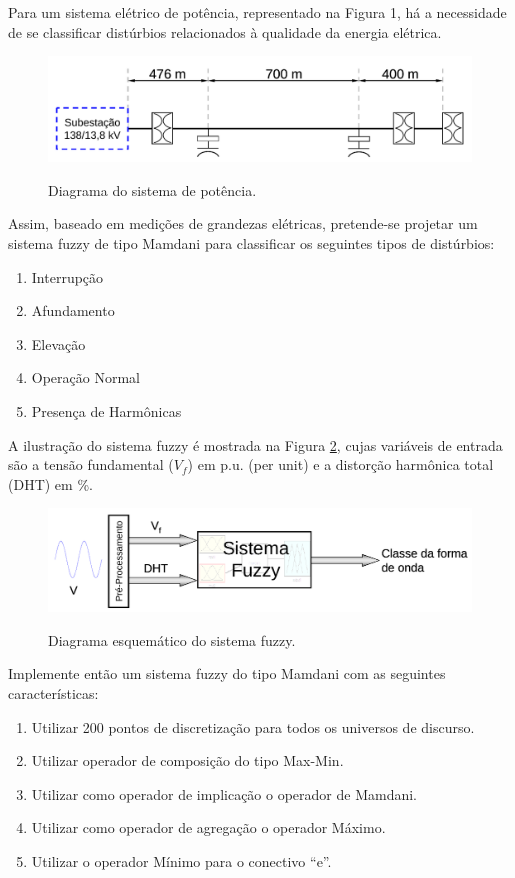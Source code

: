 \documentclass{report}
\begin{document}
\newpage

Para um sistema elétrico de potência, representado na Figura 1, há a necessidade de
se classificar distúrbios relacionados à qualidade da energia elétrica.

\begin{figure}[hptb]
\centering
\includegraphics[scale=.6]{diagrama.png}
\label{diagrama}
\caption{Diagrama do sistema de potência.}
\end{figure}

Assim, baseado em medições de grandezas elétricas, pretende-se projetar um sistema
fuzzy de tipo Mamdani para classificar os seguintes tipos de distúrbios:

\begin{enumerate}
 \item Interrupção
 \item Afundamento
 \item Elevação
 \item Operação Normal
 \item Presença de Harmônicas
\end{enumerate}

A ilustração do sistema fuzzy é mostrada na Figura \ref{esquematico}, cujas variáveis de entrada são a
tensão fundamental ($V_f$) em p.u. (per unit) e a distorção harmônica total (DHT) em \%.

\begin{figure}[hptb]
\centering
\includegraphics[scale=.6]{esquematico.png}
\label{esquematico}
\caption{Diagrama esquemático do sistema fuzzy.}
\end{figure}

Implemente então um sistema fuzzy do tipo Mamdani com as seguintes características:

\begin{enumerate}
 \item Utilizar 200 pontos de discretização para todos os universos de discurso.
 \item Utilizar operador de composição do tipo Max-Min.
 \item Utilizar como operador de implicação o operador de Mamdani.
 \item Utilizar como operador de agregação o operador Máximo.
 \item Utilizar o operador Mínimo para o conectivo “e”.
\end{enumerate}
\end{document}
